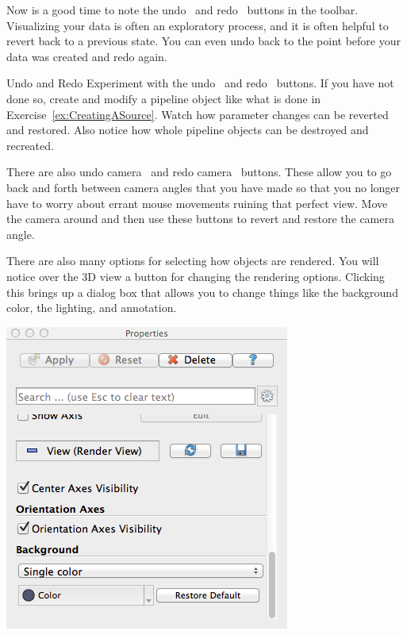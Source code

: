 
Now is a good time to note the undo~ and
redo~ buttons in the toolbar.  Visualizing your data is
often an exploratory process, and it is often helpful to revert back to a
previous state.  You can even undo back to the point before your data was
created and redo again.

\begin{exercise}{Undo and Redo}
  \label{ex:UndoAndRedo}%
  Experiment with the undo~ and redo~
  buttons.  If you have not done so, create and modify a pipeline object
  like what is done in Exercise~\ref{ex:CreatingASource}.  Watch how
  parameter changes can be reverted and restored.  Also notice how whole
  pipeline objects can be destroyed and recreated.

  There are also undo camera~ and redo
  camera~ buttons.  These allow you to go back and
  forth between camera angles that you have made so that you no longer have
  to worry about errant mouse movements ruining that perfect view.  Move
  the camera around and then use these buttons to revert and restore the
  camera angle.
\end{exercise}


There are also many options for selecting how objects are rendered.  You
will notice over the 3D view a  button for changing the
rendering options.  Clicking this brings up a dialog box that allows you to
change things like the background color, the lighting, and annotation.

\begin{inlinefig}
  \includegraphics[width=\scw]{images/RenderViewOptions}
\end{inlinefig}

